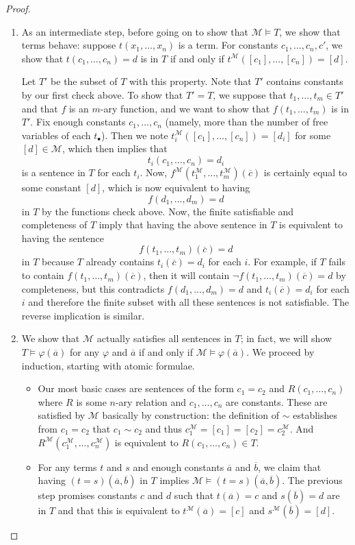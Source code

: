 \documentclass[../notes.tex]{subfiles}
\begin{document}
\begin{proof}
\begin{enumerate}
		\item As an intermediate step, before going on to show that $\mathcal M\models T$, we show that terms behave: suppose $t(x_1,\ldots,x_n)$ is a term. For constants $c_1,\ldots,c_n,c'$, we show that $t(c_1,\ldots,c_n)=d$ is in $T$ if and only if $t^\mathcal M([c_1],\ldots,[c_n])=[d]$.

		Let $T'$ be the subset of $T$ with this property. Note that $T'$ contains constants by our first check above. To show that $T'=T$, we suppose that $t_1,\ldots,t_m\in T'$ and that $f$ is an $m$-ary function, and we want to show that $f(t_1,\ldots,t_m)$ is in $T'$. Fix enough constants $c_1,\ldots,c_n$ (namely, more than the number of free variables of each $t_\bullet$). Then we note $t_i^\mathcal M([c_1],\ldots,[c_n])=[d_i]$ for some $[d]\in\mathcal M$, which then implies that
		\[t_i(c_1,\ldots,c_n)=d_i\]
		is a sentence in $T$ for each $t_i$. Now, $f^\mathcal M\left(t_1^\mathcal M,\ldots,t_m^\mathcal M\right)(\overline c)$ is certainly equal to some constant $[d]$, which is now equivalent to having
		\[f(d_1,\ldots,d_m)=d\]
		in $T$ by the functions check above. Now, the finite satisfiable and completeness of $T$ imply that having the above sentence in $T$ is equivalent to having the sentence
		\[f(t_1,\ldots,t_m)(\overline c)=d\]
		in $T$ because $T$ already contains $t_i(\overline c)=d_i$ for each $i$. For example, if $T$ fails to contain $f(t_1,\ldots,t_m)(\overline c)$, then it will contain $\lnot f(t_1,\ldots,t_m)(\overline c)=d$ by completeness, but this contradicts $f(d_1,\ldots,d_m)=d$ and $t_i(\overline c)=d_i$ for each $i$ and therefore the finite subset with all these sentences is not satisfiable. The reverse implication is similar.

		\item We show that $\mathcal M$ actually satisfies all sentences in $T$; in fact, we will show $T\models\varphi(\overline a)$ for any $\varphi$ and $\overline a$ if and only if $\mathcal M\models\varphi(\overline a)$. We proceed by induction, starting with atomic formulae.
		\begin{itemize}
			\item Our most basic cases are sentences of the form $c_1=c_2$ and $R(c_1,\ldots,c_n)$ where $R$ is some $n$-ary relation and $c_1,\ldots,c_n$ are constants. These are satisfied by $\mathcal M$ basically by construction: the definition of $\sim$ establishes from $c_1=c_2$ that $c_1\sim c_2$ and thus $c_1^\mathcal M=[c_1]=[c_2]=c_2^\mathcal M$. And $R^\mathcal M\left(c_1^\mathcal M,\ldots,c_n^\mathcal M\right)$ is equivalent to $R(c_1,\ldots,c_n)\in T$.
			\item For any terms $t$ and $s$ and enough constants $\overline a$ and $\overline b$, we claim that having $(t=s)(\overline a,\overline b)$ in $T$ implies $\mathcal M\models(t=s)(\overline a,\overline b)$. The previous step promises constants $c$ and $d$ such that $t(\overline a)=c$ and $s(\overline b)=d$ are in $T$ and that this is equivalent to $t^\mathcal M(\overline a)=[c]$ and $s^\mathcal M(\overline b)=[d]$.


\end{itemize}
\end{enumerate}
\end{proof}
\end{document}
